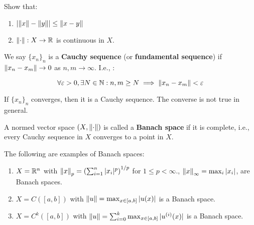 \begin{fexercise}
    Show that:
    \vspace{1em}
    \begin{enumerate}[label=(\roman*)]
        \item $\left| \left\|x\right\| - \left\|y\right\| \right| \leq \left\|x - y\right\|$
        \vspace{1em}
        \item $\left\|\cdot\right\|: X \to \mathbb{R}$ is continuous in $X$.
    \end{enumerate}
\end{fexercise}

\vspace{1em}

\begin{fdefinition}
    We say $\{x_n\}_n$ is a \textbf{Cauchy sequence} (or \textbf{fundamental sequence}) 
    if $\left\|x_n - x_m\right\| \to 0$ as $n, m \to \infty$. I.e., :

    $$\forall \varepsilon > 0, \exists N \in \mathbb{N}: n, m \geq N \implies \left\|x_n - x_m\right\| < \varepsilon$$
\end{fdefinition}

\begin{fremark}
    If $\{x_n\}_n$ converges, then it is a Cauchy sequence. The 
    converse is not true in general.
\end{fremark}

\vspace{1em}

\begin{fdefinition}
    A normed vector space $(X, \left\|\cdot\right\|)$ is called a \textbf{Banach space} if it
    is complete, i.e., every Cauchy sequence in $X$ converges to a point in $X$.
\end{fdefinition}

\begin{example}
    The following are examples of Banach spaces:
    \begin{enumerate}[label=(\roman*)]
        \item $X = \mathbb{R}^n$ with $\left\|x\right\|_p = \left( \sum_{i=1}^n |x_i|^p \right)^{1/p}$ for
        $1 \leq p < \infty$., $\left\|x\right\|_{\infty} = \max_i |x_i|$, are Banach spaces.

        \item $X = C([a, b])$ with $\left\|u\right\| = \max_{x \in [a, b]} |u(x)|$ is a Banach space.
        
        \item $X = C^k([a, b])$ with $\left\|u\right\| = \sum_{i=0}^k \max_{x \in [a, b]} |u^{(i)}(x)|$ is a Banach space.
    \end{enumerate}
\end{example}

